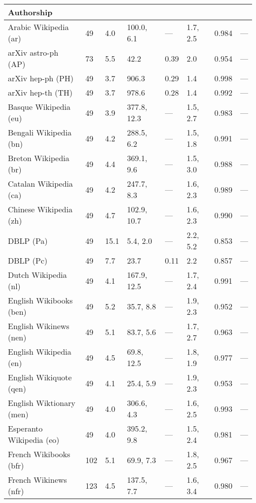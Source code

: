 \begin{longtable}{ llllllll }
\hline
\multicolumn{8}{|l|}{\textbf{Authorship}} \\
\hline
Arabic Wikipedia (\textsf{ar})    & 49 & 4.0 & 100.0, 6.1 & --- & 1.7, 2.5 & 0.984 & --- \\
arXiv astro-ph (\textsf{AP})      & 73 & 5.5 & 42.2 & 0.39 & 2.0 & 0.954 & --- \\
arXiv hep-ph (\textsf{PH})        & 49 & 3.7 & 906.3 & 0.29 & 1.4 & 0.998 & --- \\
arXiv hep-th (\textsf{TH})        & 49 & 3.7 & 978.6 & 0.28 & 1.4 & 0.992 & --- \\
Basque Wikipedia (\textsf{eu})    & 49 & 3.9 & 377.8, 12.3 & --- & 1.5, 2.7 & 0.983 & --- \\
Bengali Wikipedia (\textsf{bn})   & 49 & 4.2 & 288.5, 6.2 & --- & 1.5, 1.8 & 0.991 & --- \\
Breton Wikipedia (\textsf{br})    & 49 & 4.4 & 369.1, 9.6 & --- & 1.5, 3.0 & 0.988 & --- \\
Catalan Wikipedia (\textsf{ca})   & 49 & 4.2 & 247.7, 8.3 & --- & 1.6, 2.3 & 0.989 & --- \\
Chinese Wikipedia (\textsf{zh})   & 49 & 4.7 & 102.9, 10.7 & --- & 1.6, 2.3 & 0.990 & --- \\
DBLP (\textsf{Pa})                & 49 & 15.1 & 5.4, 2.0 & --- & 2.2, 5.2 & 0.853 & --- \\
DBLP (\textsf{Pc})                & 49 & 7.7 & 23.7 & 0.11 & 2.2 & 0.857 & --- \\
Dutch Wikipedia (\textsf{nl})     & 49 & 4.1 & 167.9, 12.5 & --- & 1.7, 2.4 & 0.991 & --- \\
English Wikibooks (\textsf{ben})  & 49 & 5.2 & 35.7, 8.8 & --- & 1.9, 2.3 & 0.952 & --- \\
English Wikinews (\textsf{nen})   & 49 & 5.1 & 83.7, 5.6 & --- & 1.7, 2.7 & 0.963 & --- \\
English Wikipedia (\textsf{en})   & 49 & 4.5 & 69.8, 12.5 & --- & 1.8, 1.9 & 0.977 & --- \\
English Wikiquote (\textsf{qen})  & 49 & 4.1 & 25.4, 5.9 & --- & 1.9, 2.3 & 0.953 & --- \\
English Wiktionary (\textsf{men}) & 49 & 4.0 & 306.6, 4.3 & --- & 1.6, 2.5 & 0.993 & --- \\
Esperanto Wikipedia (\textsf{eo}) & 49 & 4.0 & 395.2, 9.8 & --- & 1.5, 2.4 & 0.981 & --- \\
French Wikibooks (\textsf{bfr})   & 102 & 5.1 & 69.9, 7.3 & --- & 1.8, 2.5 & 0.967 & --- \\
French Wikinews (\textsf{nfr})    & 123 & 4.5 & 137.5, 7.7 & --- & 1.6, 3.4 & 0.980 & --- \\

\end{longtable}
